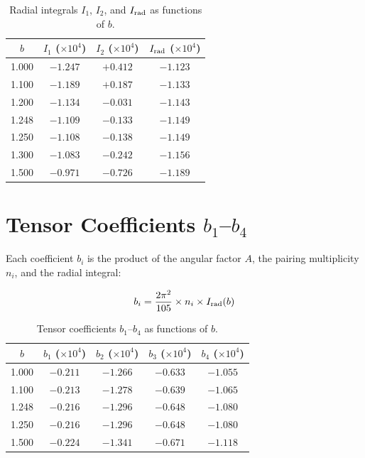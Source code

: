 \documentclass[aps,prd,onecolumn,superscriptaddress]{revtex4-2}
\begin{document}
\begin{table}[h]
\centering
\begin{tabular}{c|c|c|c}
$b$ & $I_1$ ($\times 10^4$) & $I_2$ ($\times 10^4$) & $I_{\rm rad}$ ($\times 10^4$) \\
\midrule
1.000 & $-1.247$ & $+0.412$ & $-1.123$ \\
1.100 & $-1.189$ & $+0.187$ & $-1.133$ \\
1.200 & $-1.134$ & $-0.031$ & $-1.143$ \\
1.248 & $-1.109$ & $-0.133$ & $-1.149$ \\
1.250 & $-1.108$ & $-0.138$ & $-1.149$ \\
1.300 & $-1.083$ & $-0.242$ & $-1.156$ \\
1.500 & $-0.971$ & $-0.726$ & $-1.189$ \\
\end{tabular}
\caption{Radial integrals $I_1$, $I_2$, and $I_{\rm rad}$ as functions of $b$.}
\label{tab:radial}
\end{table}

\section{Tensor Coefficients $b_1$--$b_4$}
\label{sec:S4}

Each coefficient $b_i$ is the product of the angular factor $A$, the pairing multiplicity $n_i$, and the radial integral:

\begin{equation}
b_i = \frac{2\pi^2}{105} \times n_i \times I_{\rm rad}(b)
\label{eq:bi}
\end{equation}

\begin{table}[h]
\centering
\begin{tabular}{c|c|c|c|c}
$b$ & $b_1$ ($\times 10^4$) & $b_2$ ($\times 10^4$) & $b_3$ ($\times 10^4$) & $b_4$ ($\times 10^4$) \\
\midrule
1.000 & $-0.211$ & $-1.266$ & $-0.633$ & $-1.055$ \\
1.100 & $-0.213$ & $-1.278$ & $-0.639$ & $-1.065$ \\
1.248 & $-0.216$ & $-1.296$ & $-0.648$ & $-1.080$ \\
1.250 & $-0.216$ & $-1.296$ & $-0.648$ & $-1.080$ \\
1.500 & $-0.224$ & $-1.341$ & $-0.671$ & $-1.118$ \\
\end{tabular}
\caption{Tensor coefficients $b_1$--$b_4$ as functions of $b$.}
\label{tab:bi}
\end{table}
\end{document}

